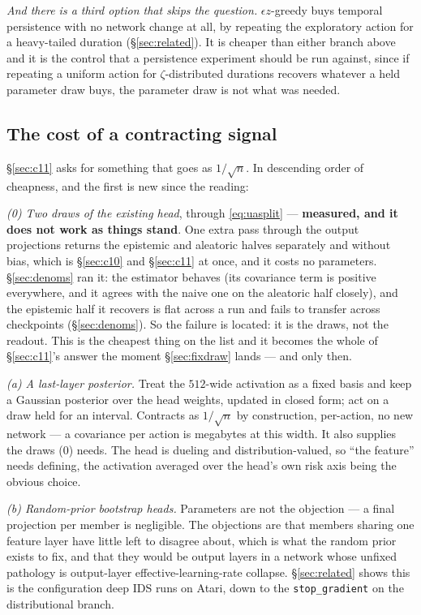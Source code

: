 \documentclass{article}
\begin{document}
\emph{And there is a third option that skips the question.} $\epsilon z$-greedy buys temporal
persistence with no network change at all, by repeating the exploratory action for a
heavy-tailed duration (\S\ref{sec:related}). It is cheaper than either branch above and it is
the control that a persistence experiment should be run against, since if repeating a uniform
action for $\zeta$-distributed durations recovers whatever a held parameter draw buys, the
parameter draw is not what was needed.

\subsection{The cost of a contracting signal}
\label{sec:contracting}

\S\ref{sec:c11} asks for something that goes as $1/\sqrt{n}$. In descending order of cheapness,
and the first is new since the reading:

\emph{(0) Two draws of the existing head}, through \eqref{eq:uasplit} --- \textbf{measured, and
it does not work as things stand}. One extra pass through the output projections returns the
epistemic and aleatoric halves separately and without bias, which is \S\ref{sec:c10} and
\S\ref{sec:c11} at once, and it costs no parameters. \S\ref{sec:denoms} ran it: the estimator
behaves (its covariance term is positive everywhere, and it agrees with the naive one on the
aleatoric half closely), and the epistemic half it recovers is flat across a run and fails to
transfer across checkpoints (\S\ref{sec:denoms}). So the failure is located: it is the draws, not
the
readout. This is the cheapest thing on the list and it becomes the whole of \S\ref{sec:c11}'s
answer the moment \S\ref{sec:fixdraw} lands --- and only then.

\emph{(a) A last-layer posterior.} Treat the $512$-wide activation as a fixed basis and keep a
Gaussian posterior over the head weights, updated in closed form; act on a draw held for an
interval. Contracts as $1/\sqrt{n}$ by construction, per-action, no new network --- a covariance
per action is megabytes at this width. It also supplies the draws (0) needs. The head is
dueling and distribution-valued, so ``the feature'' needs defining, the activation averaged over
the head's own risk axis being the obvious choice.

\emph{(b) Random-prior bootstrap heads.} Parameters are not the objection --- a final projection
per member is negligible. The objections are that members sharing one feature layer have
little left to disagree about, which is what the random prior exists to fix, and that they would
be output layers in a network whose unfixed pathology is output-layer effective-learning-rate
collapse. \S\ref{sec:related} shows this is the configuration deep IDS runs on Atari, down to the
\texttt{stop\_gradient} on the distributional branch.
\end{document}
